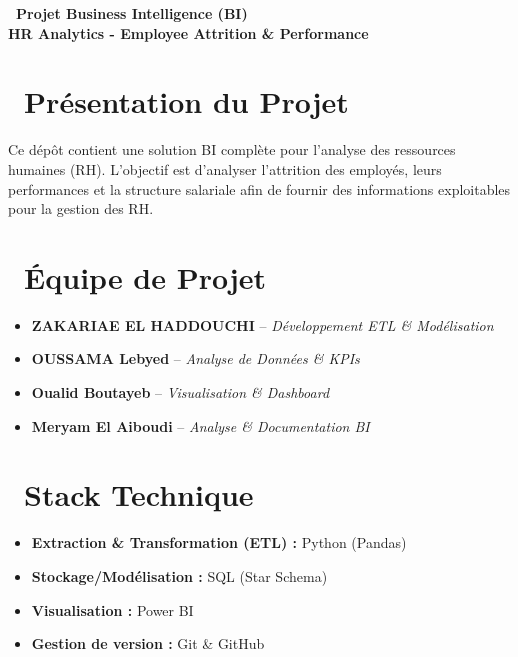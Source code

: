 \documentclass[11pt, a4paper]{article}
\begin{document}
\begin{center}
    {\Huge \textbf{\color{primary} \faChartBar \ Projet Business Intelligence (BI)}} \\
    \vspace{0.3cm}
    {\LARGE \textbf{HR Analytics - Employee Attrition \& Performance}}
\end{center}

\vspace{0.8cm}

\section*{\faBullseye \ Présentation du Projet}
Ce dépôt contient une solution BI complète pour l'analyse des ressources humaines (RH). L'objectif est d'analyser l'attrition des employés, leurs performances et la structure salariale afin de fournir des informations exploitables pour la gestion des RH.

\vspace{0.5cm}

\section*{\faUsers \ Équipe de Projet}
\begin{itemize}
    \item \textbf{ZAKARIAE EL HADDOUCHI} -- \textit{Développement ETL \& Modélisation}
    \item \textbf{OUSSAMA Lebyed} -- \textit{Analyse de Données \& KPIs}
    \item \textbf{Oualid Boutayeb} -- \textit{Visualisation \& Dashboard}
    \item \textbf{Meryam El Aiboudi} -- \textit{Analyse \& Documentation BI}
\end{itemize}

\vspace{0.5cm}

\section*{\faTools \ Stack Technique}
\begin{itemize}
    \item \textbf{Extraction \& Transformation (ETL) :} Python (Pandas)
    \item \textbf{Stockage/Modélisation :} SQL (Star Schema)
    \item \textbf{Visualisation :} Power BI
    \item \textbf{Gestion de version :} Git \& GitHub
\end{itemize}
\end{document}
